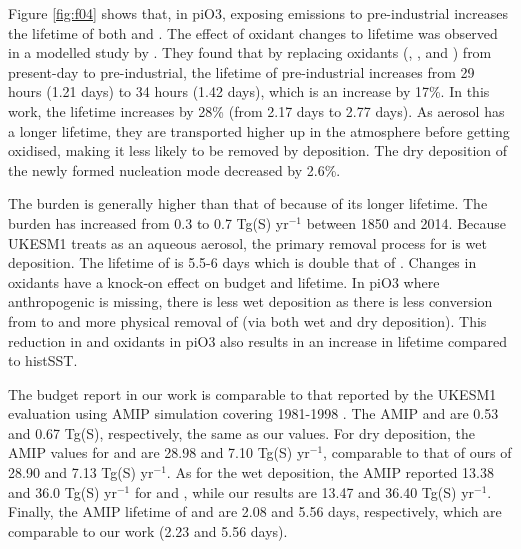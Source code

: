 Figure \ref{fig:f04} shows that, in piO3, exposing  emissions to pre-industrial  increases the lifetime of both  and . The effect of oxidant changes to  lifetime was observed in a modelled study by \citep{karsetStrongImpactsAerosol2018}. They found that by replacing oxidants (, ,  and ) from present-day to pre-industrial, the lifetime of pre-industrial  increases from 29 hours (1.21 days) to 34 hours (1.42 days), which is an increase by 17\%. In this work, the  lifetime increases by 28\% (from 2.17 days to 2.77 days). As aerosol has a longer lifetime, they are transported higher up in the atmosphere before getting oxidised, making it less likely to be removed by deposition. The dry deposition of the newly formed nucleation mode  decreased by 2.6\%. 

The  burden is generally higher than that of  because of its longer lifetime. The  burden has increased from 0.3 to 0.7 Tg(S) yr$^{-1}$ between 1850 and 2014. Because UKESM1 treats  as an aqueous aerosol, the primary removal process for  is wet deposition. The lifetime of  is 5.5-6 days which is double that of . Changes in oxidants have a knock-on effect on  budget and lifetime. In piO3 where anthropogenic  is missing, there is less  wet deposition as there is less conversion from  to  and more physical removal of  (via both wet and dry deposition). This reduction in  and oxidants in piO3 also results in an increase in  lifetime compared to histSST. 


The budget report in our work is comparable to that reported by the UKESM1 evaluation using AMIP simulation covering 1981-1998 \citep{mulcahyDescriptionEvaluationAerosol2020}. The AMIP  and  are 0.53 and 0.67 Tg(S), respectively, the same as our values. For dry deposition, the AMIP values for  and  are 28.98 and 7.10 Tg(S) yr$^{-1}$, comparable to that of ours of 28.90 and 7.13 Tg(S) yr$^{-1}$. As for the wet deposition, the AMIP reported 13.38 and 36.0 Tg(S) yr$^{-1}$ for  and , while our results are 13.47 and 36.40 Tg(S) yr$^{-1}$. Finally, the AMIP lifetime of  and  are 2.08 and 5.56 days, respectively, which are comparable to our work (2.23 and 5.56 days).  

